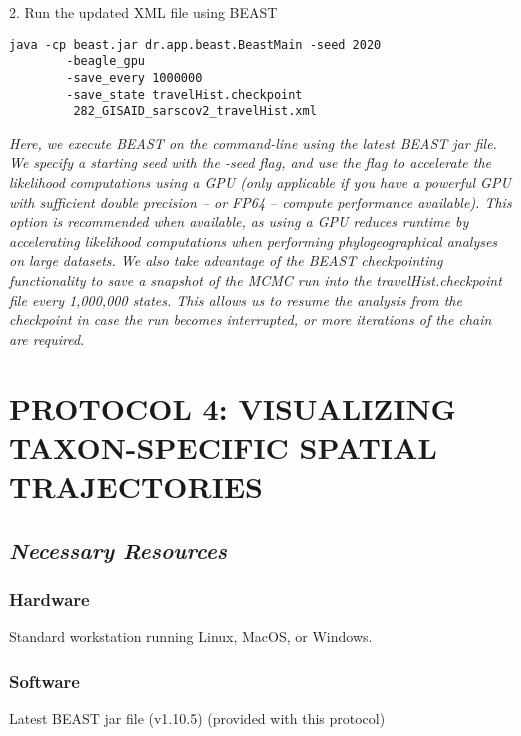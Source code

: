 \documentclass{article}
\newcommand{\ann}[1]{
\begin{adjustwidth}{0.5cm}{}
\it{#1}\\
\end{adjustwidth}}
\newcommand{\code}[1]{
{\upshape\ttfamily{#1}}}
\begin{document}
2. Run the updated XML file using BEAST
\begin{verbatim}
java -cp beast.jar dr.app.beast.BeastMain -seed 2020  
        -beagle_gpu
        -save_every 1000000
        -save_state travelHist.checkpoint
         282_GISAID_sarscov2_travelHist.xml
\end{verbatim}

\ann{Here, we execute BEAST on the command-line using the latest BEAST jar file. We specify a starting seed with the -seed flag, %
and use the \code{-beagle\_cuda} flag to accelerate the likelihood computations using a GPU (only applicable if you have a powerful GPU with sufficient double precision -- or FP64 -- compute performance available).
This option is recommended when available, as using a GPU reduces runtime by accelerating likelihood computations when performing phylogeographical analyses on large datasets.
We also take advantage of the BEAST checkpointing functionality %
to save a snapshot of the MCMC run into the travelHist.checkpoint file every 1,000,000 states.
This allows us to resume the analysis from the checkpoint in case the run becomes interrupted, or more iterations of the chain are required.}

\section*{PROTOCOL 4: VISUALIZING TAXON-SPECIFIC SPATIAL TRAJECTORIES} %
\subsection*{\textbf{\textit{Necessary Resources}}}
\subsubsection*{Hardware}
Standard workstation running Linux, MacOS, or Windows. 

\subsubsection*{Software}

\hspace{0.5cm}Latest BEAST jar file (v1.10.5) (provided with this protocol)
\end{document}

